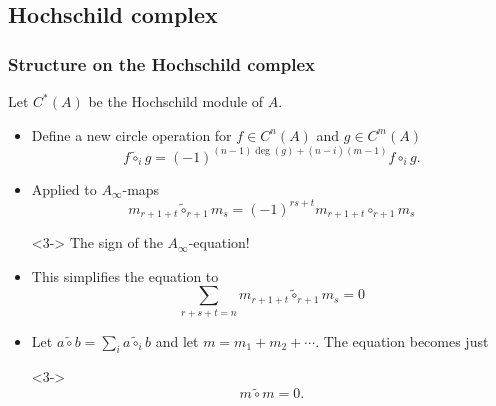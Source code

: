 \documentclass{beamer}
\theoremstyle{definition}
\begin{document}
\subsection{Hochschild complex}
\begin{frame}
\frametitle{Structure on the Hochschild complex}
Let $C^*(A)$ be the Hochschild module of $A$. %
\begin{itemize}
\item<1-> Define a new circle operation for $f\in C^n(A)$ and $g\in C^m(A)$ %
\[f\tilde{\circ}_ig=(-1)^{(n-1)\deg(g)+(n-i)(m-1)}f\circ_i g.\]
\item<2-> Applied to  $A_\infty$-maps 
\[m_{r+1+t}\tilde{\circ}_{r+1}m_s=(-1)^{rs+t}m_{r+1+t}\circ_{r+1}m_s\]
\item[]<3-> The sign of the $A_\infty$-equation!
\end{itemize}
\end{frame}



\begin{frame}
\begin{itemize}
\item<1-> This simplifies the equation to
\[\sum_{r+s+t=n}m_{r+1+t}\tilde{\circ}_{r+1}m_s=0\] %
\item<2-> Let $a\tilde{\circ}b=\sum_{i}a\tilde{\circ}_ib$ and let $m=m_1+m_2+\cdots$. The equation becomes just
\item[]<3-> \[m\tilde{\circ}m=0.\]
\end{itemize}
\end{frame}
\end{document}
